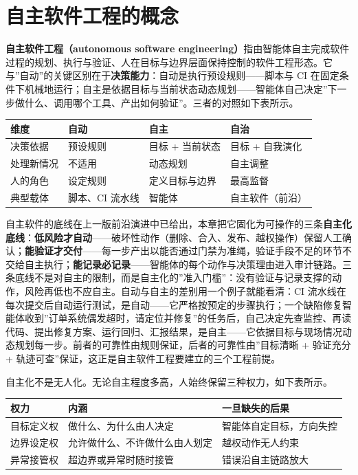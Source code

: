 \documentclass[12pt,a4paper,twoside,openany]{ctexbook}
\numberwithin{figure}{chapter}
\numberwithin{table}{chapter}
\newcounter{none}
\begin{document}
\section{自主软件工程的概念}\label{ux81eaux4e3bux8f6fux4ef6ux5de5ux7a0bux7684ux6982ux5ff5}

\textbf{自主软件工程（autonomous software
engineering）}指由智能体自主完成软件过程的规划、执行与验证、人在目标与边界层面保持控制的软件工程形态。它与''自动''的关键区别在于\textbf{决策能力}：自动是执行预设规则------脚本与
CI
在固定条件下机械地运行；自主是依据目标与当前状态动态规划------智能体自己决定''下一步做什么、调用哪个工具、产出如何验证''。三者的对照如下表所示。

{\def\LTcaptype{none} %
\begin{longtable}[]{@{}llll@{}}
\toprule\noalign{}
维度 & 自动 & 自主 & 自治 \\
\midrule\noalign{}
\endhead
\bottomrule\noalign{}
\endlastfoot
决策依据 & 预设规则 & 目标 + 当前状态 & 目标 + 自我演化 \\
处理新情况 & 不适用 & 动态规划 & 自主调整 \\
人的角色 & 设定规则 & 定义目标与边界 & 最高监督 \\
典型载体 & 脚本、CI 流水线 & 智能体 & 自主软件（前沿） \\
\end{longtable}
}

自主软件的底线在上一版前沿演进中已给出，本章把它固化为可操作的三条\textbf{自主化底线}：\textbf{低风险才自动}------破坏性动作（删除、合入、发布、越权操作）保留人工确认；\textbf{能验证才交付}------每一步产出以能否通过门禁为准绳，验证手段不足的环节不交给自主执行；\textbf{能记录必记录}------智能体的每个动作与决策理由进入审计链路。三条底线不是对自主的限制，而是自主化的''准入门槛''：没有验证与记录支撑的动作，风险再低也不应自主。自动与自主的差别用一个例子就能看清：CI
流水线在每次提交后自动运行测试，是自动------它严格按预定的步骤执行；一个缺陷修复智能体收到''订单系统偶发超时，请定位并修复''的任务后，自己决定先查监控、再读代码、提出修复方案、运行回归、汇报结果，是自主------它依据目标与现场情况动态规划每一步。前者的可靠性由规则保证，后者的可靠性由''目标清晰
+ 验证充分 + 轨迹可查''保证，这正是自主软件工程要建立的三个工程前提。

自主化不是无人化。无论自主程度多高，人始终保留三种权力，如下表所示。

{\def\LTcaptype{none} %
\begin{longtable}[]{@{}lll@{}}
\toprule\noalign{}
权力 & 内涵 & 一旦缺失的后果 \\
\midrule\noalign{}
\endhead
\bottomrule\noalign{}
\endlastfoot
目标定义权 & 做什么、为什么由人决定 & 智能体自定目标，方向失控 \\
边界设定权 & 允许做什么、不许做什么由人划定 & 越权动作无人约束 \\
异常接管权 & 超边界或异常时随时接管 & 错误沿自主链路放大 \\
\end{longtable}
}
\end{document}
